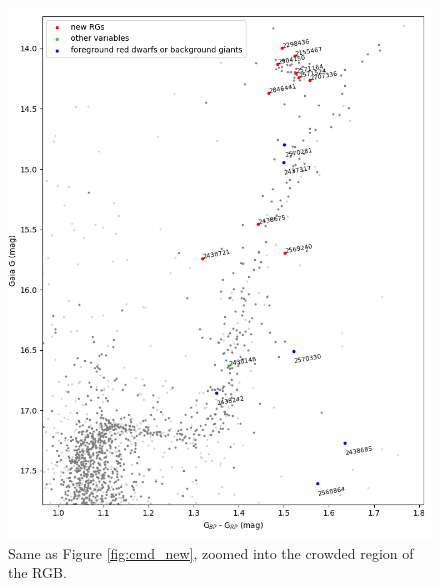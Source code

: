 \begin{figure}
    \centering
    \includegraphics[width=\linewidth]{Chapter5/6791_CMD_zoom.png}
    \caption[NGC\,6791 CMD zoom]{Same as Figure \ref{fig:cmd_new}, zoomed into the crowded region of the RGB.}
    \label{fig:cmd_newz}
\end{figure}


